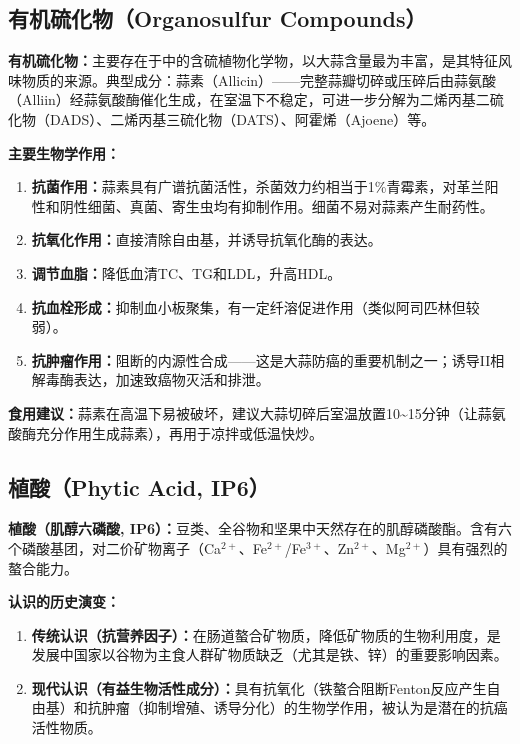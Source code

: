 \subsection{有机硫化物（Organosulfur Compounds）}

\begin{tipbox}
\textbf{有机硫化物：}主要存在于中的含硫植物化学物，以大蒜含量最为丰富，是其特征风味物质的来源。典型成分：蒜素（Allicin）——完整蒜瓣切碎或压碎后由蒜氨酸（Alliin）经蒜氨酸酶催化生成，在室温下不稳定，可进一步分解为二烯丙基二硫化物（DADS）、二烯丙基三硫化物（DATS）、阿霍烯（Ajoene）等。

\textbf{主要生物学作用：}
\begin{enumerate}[leftmargin=*]
    \item \textbf{抗菌作用：}蒜素具有广谱抗菌活性，杀菌效力约相当于1\%青霉素，对革兰阳性和阴性细菌、真菌、寄生虫均有抑制作用。细菌不易对蒜素产生耐药性。
    \item \textbf{抗氧化作用：}直接清除自由基，并诱导抗氧化酶的表达。
    \item \textbf{调节血脂：}降低血清TC、TG和LDL，升高HDL。
    \item \textbf{抗血栓形成：}抑制血小板聚集，有一定纤溶促进作用（类似阿司匹林但较弱）。
    \item \textbf{抗肿瘤作用：}阻断的内源性合成——这是大蒜防癌的重要机制之一；诱导II相解毒酶表达，加速致癌物灭活和排泄。
\end{enumerate}

\textbf{食用建议：}蒜素在高温下易被破坏，建议大蒜切碎后室温放置10\~{}15分钟（让蒜氨酸酶充分作用生成蒜素），再用于凉拌或低温快炒。
\end{tipbox}

\subsection{植酸（Phytic Acid, IP6）}

\begin{tipbox}
\textbf{植酸（肌醇六磷酸, IP6）：}豆类、全谷物和坚果中天然存在的肌醇磷酸酯。含有六个磷酸基团，对二价矿物离子（Ca$^{2+}$、Fe$^{2+}$/Fe$^{3+}$、Zn$^{2+}$、Mg$^{2+}$）具有强烈的螯合能力。

\textbf{认识的历史演变：}
\begin{enumerate}[leftmargin=*]
    \item \textbf{传统认识（抗营养因子）：}在肠道螯合矿物质，降低矿物质的生物利用度，是发展中国家以谷物为主食人群矿物质缺乏（尤其是铁、锌）的重要影响因素。
    \item \textbf{现代认识（有益生物活性成分）：}具有抗氧化（铁螯合阻断Fenton反应产生自由基）和抗肿瘤（抑制增殖、诱导分化）的生物学作用，被认为是潜在的抗癌活性物质。
\end{enumerate}
\end{tipbox}

